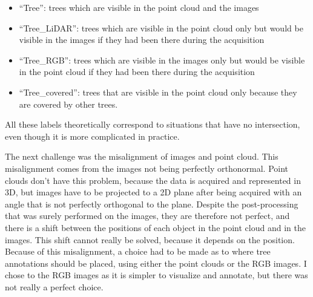 \documentclass[
  letterpaper,
  DIV=11,
  numbers=noendperiod]{scrartcl}
\providecommand{\tightlist}{%
  \setlength{\itemsep}{0pt}\setlength{\parskip}{0pt}}\usepackage{longtable,booktabs,array}
\begin{document}
\begin{itemize}
\tightlist
\item
  ``Tree'': trees which are visible in the point cloud and the images
\item
  ``Tree\_LiDAR'': trees which are visible in the point cloud only but
  would be visible in the images if they had been there during the
  acquisition
\item
  ``Tree\_RGB'': trees which are visible in the images only but would be
  visible in the point cloud if they had been there during the
  acquisition
\item
  ``Tree\_covered'': trees that are visible in the point cloud only
  because they are covered by other trees.
\end{itemize}

All these labels theoretically correspond to situations that have no
intersection, even though it is more complicated in practice.

The next challenge was the misalignment of images and point cloud. This
misalignment comes from the images not being perfectly orthonormal.
Point clouds don't have this problem, because the data is acquired and
represented in 3D, but images have to be projected to a 2D plane after
being acquired with an angle that is not perfectly orthogonal to the
plane. Despite the post-processing that was surely performed on the
images, they are therefore not perfect, and there is a shift between the
positions of each object in the point cloud and in the images. This
shift cannot really be solved, because it depends on the position.
Because of this misalignment, a choice had to be made as to where tree
annotations should be placed, using either the point clouds or the RGB
images. I chose to the RGB images as it is simpler to visualize and
annotate, but there was not really a perfect choice.
\end{document}
